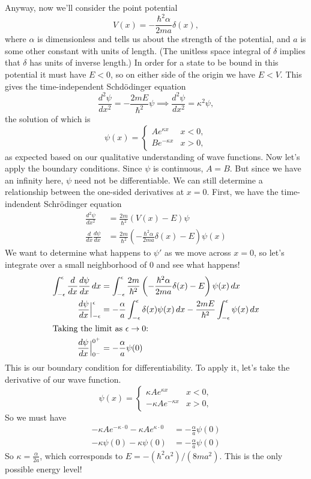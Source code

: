 \documentclass[../p052main.tex]{subfiles}
\begin{document}
Anyway, now we'll consider the point potential
\[ V(x) = -\frac{\hbar^2 \alpha}{2ma} \delta(x), \]
where $\alpha$ is dimensionless and tells us about the strength of the potential, and $a$ is some other constant with units of length.
(The unitless space integral of $\delta$ implies that $\delta$ has units of inverse length.)
In order for a state to be bound in this potential it must have $E < 0$, so on either side of the origin we have $E < V$.
This gives the time-independent Schdödinger equation
\[ \frac{d^2 \psi}{d x^2} = -\frac{2mE}{\hbar^2} \psi \implies \frac{d^2 \psi}{d x^2} = \kappa^2 \psi, \]
the solution of which is
\[ \psi(x) = \begin{cases} Ae^{\kappa x} & x < 0, \\ Be^{-\kappa x} & x > 0, \end{cases} \]
as expected based on our qualitative understanding of wave functions.
Now let's apply the boundary conditions.
Since $\psi$ is continuous, $A = B$.
But since we have an infinity here, $\psi$ need not be differentiable.
We can still determine a relationship between the one-sided derivatives at $x=0$.
First, we have the time-indendent Schrödinger equation
\begin{align*}
    \frac{d^2 \psi}{d x^2} &= \frac{2m}{\hbar^2} \left( V(x) - E \right) \psi \\
    \frac{d}{dx} \frac{d\psi}{dx} &= \frac{2m}{\hbar^2} \left( -\frac{\hbar^2 \alpha}{2ma} \delta(x) - E \right) \psi(x)
\end{align*}
We want to determine what happens to $\psi'$ as we move across $x=0$, so let's integrate over a small neighborhood of 0 and see what happens!
\begin{align*}
    \int_{-\epsilon}^{\epsilon} \frac{d}{dx} \frac{d\psi}{dx} \,dx &= \int_{-\epsilon}^{\epsilon} \frac{2m}{\hbar^2} \left( -\frac{\hbar^2 \alpha}{2ma} \delta(x) - E \right) \psi(x) \,dx \\
    \frac{d\psi}{dx} \Big|_{-\epsilon}^\epsilon &= -\frac{\alpha}{a} \int_{-\epsilon}^{\epsilon} \delta(x) \psi(x) \,dx - \frac{2mE}{\hbar^2} \int_{-\epsilon}^{\epsilon} \psi(x) \,dx \\
    \intertext{Taking the limit as $\epsilon \to 0$:}
    \frac{d\psi}{dx}\Big|_{0^-}^{0^+} &= -\frac{\alpha}{a}\psi(0)
\end{align*}
This is our boundary condition for differentiability.
To apply it, let's take the derivative of our wave function.
\[ \psi(x) = \begin{cases} \kappa Ae^{\kappa x} & x < 0, \\ -\kappa Ae^{-\kappa x} & x > 0, \end{cases} \]
So we must have
\begin{align*}
    -\kappa Ae^{-\kappa \cdot 0} - \kappa A e^{\kappa \cdot 0} &= -\frac{\alpha}{a}\psi(0) \\
    -\kappa \psi(0) - \kappa \psi(0) &= -\frac{\alpha}{a}\psi(0)
\end{align*}
So $\kappa = \frac{\alpha}{2a}$, which corresponds to $E = -(\hbar^2 \alpha^2) / (8ma^2)$.
This is the only possible energy level!
\end{document}
